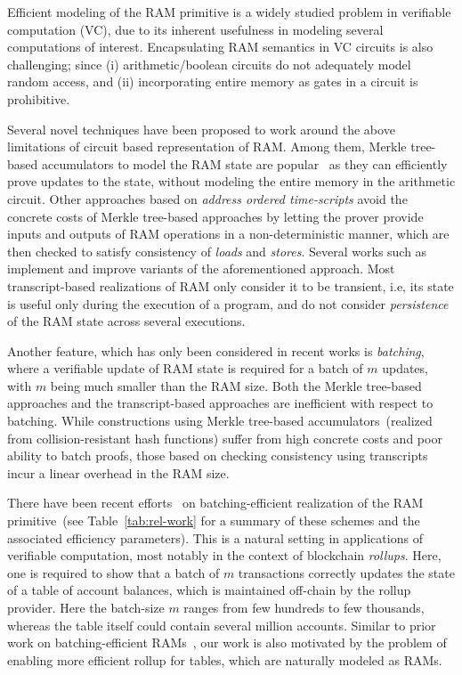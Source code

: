 Efficient modeling of the RAM primitive is a widely studied problem in
verifiable computation (VC), due to its inherent usefulness in modeling several computations of interest.
Encapsulating RAM semantics in VC circuits is also challenging; since (i) arithmetic/boolean circuits do not
adequately model random access, and (ii) incorporating entire memory as gates in a circuit is prohibitive.

Several novel techniques have been proposed to work around the above limitations of circuit based representation
of RAM. Among them, Merkle tree-based accumulators to model the RAM state are popular~\cite{EPRINT:BFRSBW13,compwithstate,C:BCTV14} as they can efficiently
prove updates to the state, without modeling the entire memory in the arithmetic circuit. Other
approaches based on {\em address ordered time-scripts} avoid the concrete costs of Merkle tree-based approaches
by letting the prover provide inputs and outputs of RAM operations in a non-deterministic manner, which
are then checked to satisfy consistency of {\em loads} and {\em stores}.
Several works such as \cite{NDSS:WSRBW15,USENIX:BCTV14,C:BCGTV13,SP:ZGKPP18} implement and improve variants
of the aforementioned approach. Most transcript-based realizations of RAM only consider it to be transient,
i.e, its state is useful only during the execution of a program, and do not consider {\em persistence} of the
RAM state across several executions. 

Another feature, which has only been considered in recent works
\cite{USENIX:OWWB20,CCS:CFHKKO22} is {\em batching}, where a verifiable update of RAM state is required
for a batch of $m$ updates, with $m$ being much smaller than the RAM size. Both the Merkle tree-based approaches
and the transcript-based approaches are inefficient with respect to batching.
While constructions using Merkle tree-based accumulators~(realized from collision-resistant hash functions) suffer from high concrete costs and poor
ability to batch proofs, those based on checking consistency using transcripts incur a linear overhead in the
RAM size.

\smallskip

 There have been recent efforts~\cite{USENIX:OWWB20,CCS:CFHKKO22} on batching-efficient
realization of the RAM primitive~(see Table~\ref{tab:rel-work} for a summary of these schemes and the associated efficiency parameters). This is a natural setting in applications of verifiable
computation, most notably in the context of blockchain {\em rollups}. Here, one is required
to show that a batch of $m$ transactions correctly updates the state of a table of account balances, which
is maintained off-chain by the rollup provider. Here the batch-size $m$ ranges from few hundreds to few
thousands, whereas the table itself could contain several million accounts.
Similar to prior work on batching-efficient RAMs~\cite{USENIX:OWWB20,CCS:CFHKKO22}, our work is also motivated
 by the problem of enabling more efficient rollup for tables, which are
naturally modeled as RAMs.

